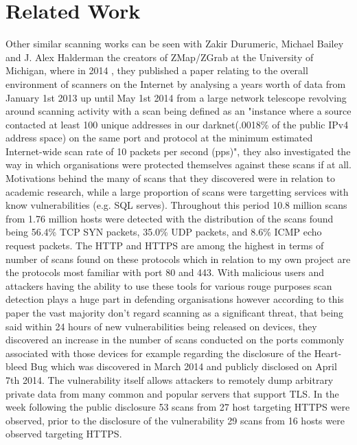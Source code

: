\documentclass[a4wide,leqno,12pt]{report}
\begin{document}
\chapter{Related Work}
Other similar scanning works can be seen with Zakir Durumeric, Michael Bailey and J. Alex Halderman the creators of ZMap/ZGrab at the University of Michigan,  where in 2014 \cite{durumeric2014internet}, they published a paper relating to the overall environment of scanners on the Internet by analysing a years worth of data from January 1st 2013 up until May 1st 2014 from a large network telescope revolving around scanning activity with a scan being defined as an "instance where a source contacted at least 100 unique addresses in our darknet(.0018\% of the public IPv4 address space) on the same port and protocol at the minimum estimated Internet-wide scan rate of 10 packets per second (pps)", they also investigated the way in which organisations were protected themselves against these scans if at all. Motivations behind the many of scans that they discovered were in relation to academic research, while a large proportion of scans were targetting services with know vulnerabilities (e.g. SQL serves). Throughout this period 10.8 million scans from 1.76 million hosts were detected with the distribution of the scans found being 56.4\% TCP SYN packets, 35.0\% UDP packets, and 8.6\% ICMP echo request packets. The HTTP and HTTPS are among the highest in terms of number of scans found on these protocols which in relation to my own project are the protocols most familiar with port 80 and 443. With malicious users and attackers having the ability to use these tools for various rouge purposes scan detection plays a huge part in defending organisations however according to this paper the vast majority don't regard scanning as a significant threat, that being said within 24 hours of new vulnerabilities being released on devices, they discovered an increase in the number of scans conducted on the ports commonly associated with those devices for example regarding the disclosure of the Heart-bleed Bug which was discovered in March 2014 and publicly disclosed on April 7th 2014. The vulnerability itself allows attackers to remotely dump arbitrary private data from many common and popular servers that support TLS. In the week following the public disclosure 53 scans from 27 host targeting HTTPS were observed, prior to the disclosure of the vulnerability 29 scans from 16 hosts were observed targeting HTTPS.\\
\end{document}
